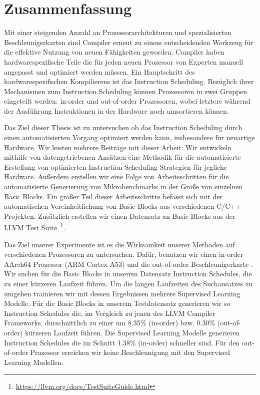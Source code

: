 \chapter*{Zusammenfassung}
Mit einer steigenden Anzahl an Prozessorarchitekturen und spezialisierten Beschleunigerkarten sind Compiler erneut zu einem entscheidenden Werkzeug für die effektive Nutzung von neuen Fähigkeiten geworden.
Compiler haben hardwarespezifische Teile die für jeden neuen Prozessor von Experten manuell angepasst und optimiert werden müssen.
Ein Hauptschritt des hardwarespezifischen Kompilierens ist das Instruction Scheduling.
Bezüglich ihrer Mechanismen zum Instruction Scheduling können Prozessoren in zwei Gruppen eingeteilt werden: in-order und out-of-order Prozessoren, wobei letztere während der Ausführung Instruktionen in der Hardware noch umsortieren können.

Das Ziel dieser Thesis ist zu untersuchen ob das Instruction Scheduling durch einen automatisierten Vorgang optimiert werden kann, insbesondere für neuartige Hardware.
Wir leisten mehrere Beiträge mit dieser Arbeit:
Wir entwickeln mithilfe von datengetriebenen Ansätzen eine Methodik für die automatisierte Erstellung von optimierten Instruction Scheduling Strategien für jegliche Hardware.
Außerdem erstellen wir eine Folge von Arbeitsschritten für die automatisierte Generierung von Mikrobenchmarks in der Größe von einzelnen Basic Blocks.
Ein großer Teil dieser Arbeitsschritte befasst sich mit der automatischen Vereinheitlichung von Basic Blocks aus verschiedenen C/C++ Projekten.
Zusätzlich erstellen wir einen Datensatz an Basic Blocks aus der LLVM Test Suite~\footnote[1]{\url{https://llvm.org/docs/TestSuiteGuide.html}}.

Das Ziel unserer Experimente ist es die Wirksamkeit unserer Methoden auf verschiedenen Prozessoren zu untersuchen.
Dafür, benutzen wir einen in-order AArch64 Prozessor (ARM Cortex-A53) und die out-of-order Beschleunigerkarte \aurora{}.
Wir suchen für die Basic Blocks in unserem Datensatz Instruction Schedules, die zu einer kürzeren Laufzeit führen.
Um die langen Laufzeiten des Suchansatzes zu umgehen trainieren wir mit dessen Ergebnissen mehrere Supervised Learning Modelle.
Für die Basic Blocks in unserem Testdatensatz generieren wir so Instruction Schedules die, im Vergleich zu jenen des LLVM Compiler Frameworks, durschnittlich zu einer um 8.35\% (in-order) bzw. 0.30\% (out-of-order) kürzeren Laufzeit führen.
Die Supervised Learning Modelle generieren Instruction Schedules die im Schnitt 1.38\% (in-order) schneller sind.
Für den out-of-order Prozessor erreichen wir keine Beschleunigung mit den Supervised Learning Modellen.
